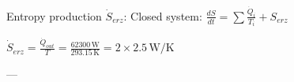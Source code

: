 Entropy production \( \dot{S}_{erz} \):  
Closed system:  
\( \frac{dS}{dt} = \sum \frac{\dot{Q}_i}{T_i} + S_{erz} \)  

\( \dot{S}_{erz} = \frac{\dot{Q}_{out}}{T} = \frac{62300 \, \text{W}}{293.15 \, \text{K}} = 2 \times 2.5 \, \text{W/K} \)  

---